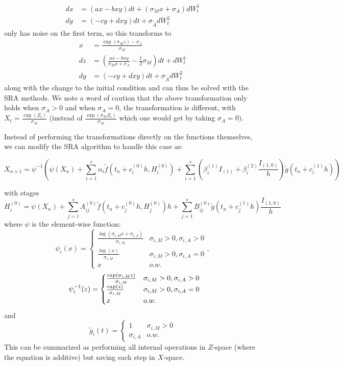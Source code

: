 \documentclass{article}
\begin{document}
\begin{align*}
dx & =\left(ax-bxy\right)dt+\left(\sigma_{M}x+\sigma_{A}\right)dW_{t}^{1}\\
dy & =\left(-cy+dxy\right)dt+\sigma_{\tilde{A}}dW_{t}^{2}
\end{align*}
only has noise on the first term, so this transforms to
\begin{align*}
x & =\frac{\exp(\sigma_{M}z)-\sigma_{A}}{\sigma_{M}}\\
dz & =\left(\frac{ax-bxy}{\sigma_{M}x+\sigma_{A}}-\frac{1}{2}\sigma_{M}\right)dt+dW_{t}^{1}\\
dy & =\left(-cy+dxy\right)dt+\sigma_{\tilde{A}}dW_{t}^{2}
\end{align*}
along with the change to the initial condition and can thus be solved
with the SRA methods. We note a word of caution that the above transformation
only holds when $\sigma_{A}>0$ and when $\sigma_{A}=0$, the transformation
is different, with $X_{t}=\frac{\exp\left(Z_{t}\right)}{\sigma_{M}}$
(instead of $\frac{\exp\left(\sigma_{M}Z_{t}\right)}{\sigma_{M}}$
which one would get by taking $\sigma_{A}=0$).

Instead of performing the transformations directly on the functions
themselves, we can modify the SRA algorithm to handle this case as:

{\scriptsize
\begin{equation}
X_{n+1}=\psi^{-1}\left(\psi\left(X_{n}\right)+\sum_{i=1}^{s}\alpha_{i}\tilde{f}\left(t_{n}+c_{i}^{(0)}h,H_{i}^{(0)}\right)+\sum_{i=1}^{s}\left(\beta_{i}^{(1)}I_{(1)}+\beta_{i}^{(2)}\frac{I_{(1,0)}}{h}\right)\tilde{g}\left(t_{n}+c_{i}^{(1)}h\right)\right)\label{eq:AffineStep}
\end{equation}
}%

with stages
\begin{equation}
H_{i}^{(0)}=\psi\left(X_{n}\right)+\sum_{j=1}^{s}A_{ij}^{(0)}\tilde{f}\left(t_{n}+c_{j}^{(0)}h,H_{j}^{(0)}\right)h+\sum_{j=1}^{s}B_{ij}^{(0)}\tilde{g}\left(t_{n}+c_{j}^{(1)}h\right)\frac{I_{(1,0)}}{h}\label{eq:AffineStep2}
\end{equation}
where $\psi$ is the element-wise function:
\[
\psi_{i}(x)=\begin{cases}
\frac{\log(\sigma_{i,M}x+\sigma_{i,A})}{\sigma_{i,M}} & \sigma_{i,M}>0,\sigma_{i,A}>0\\
\frac{\log(x)}{\sigma_{i,M}} & \sigma_{i,M}>0,\sigma_{i,A}=0\\
x & o.w.
\end{cases},
\]
\[
\thinspace\thinspace\thinspace\psi_{i}^{-1}(z)=\begin{cases}
\frac{\exp\left(\sigma_{i,M}z\right)}{\sigma_{i,M}} & \sigma_{i,M}>0,\sigma_{i,A}>0\\
\frac{\exp\left(z\right)}{\sigma_{i,M}} & \sigma_{i,M}>0,\sigma_{i,A}=0\\
x & o.w.
\end{cases}
\]
and
\[
\tilde{g}_{i}(t)=\begin{cases}
1 & \sigma_{i,M}>0\\
\sigma_{i,A} & o.w.
\end{cases}
\]
This can be summarized as performing all internal operations in $Z$-space
(where the equation is additive) but saving each step in $X$-space.
\end{document}
